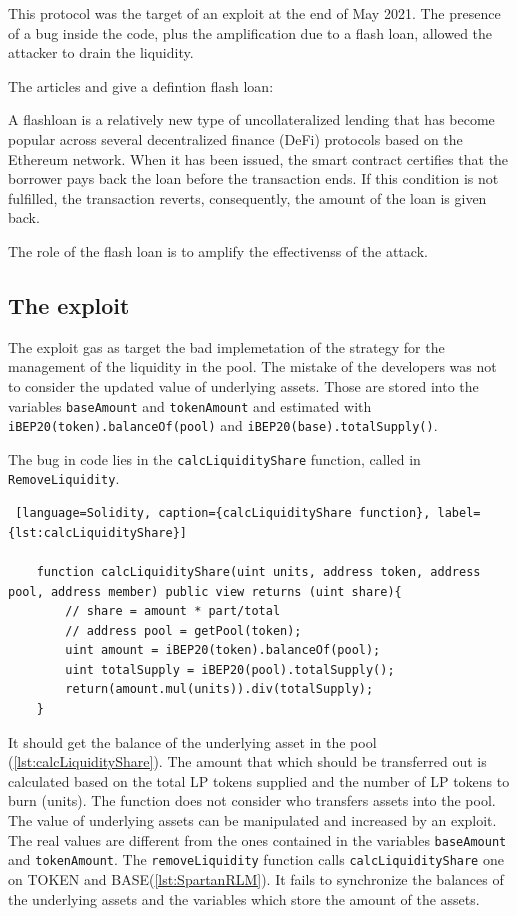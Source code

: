 This protocol was the target of an exploit at the end of May 2021.
The presence of a bug inside the code, plus the amplification due to a flash loan, allowed the attacker to drain the liquidity.

The articles \citet{FlashCoin} and \citet{FlashCloud} give a defintion flash loan:
\begin{definition}
A flashloan is a relatively new type of uncollateralized lending that has become popular across
several decentralized finance (DeFi) protocols based on the Ethereum network. 
When it has been issued, the smart contract certifies that the borrower pays back the loan before the transaction ends. 
If this condition is not fulfilled, the transaction reverts, consequently, the amount of the loan is given back. 
  \end{definition}


The role of the flash loan is to amplify the effectivenss of the attack.

\subsection{The exploit}
\label{sec:Spartan:Exploit}
The exploit gas as target the bad implemetation of the strategy for the management of the liquidity in the pool.
The mistake of the developers was not to consider the updated value of underlying assets. 
Those are stored into the variables \texttt{baseAmount} and \texttt{tokenAmount} and estimated with \texttt{iBEP20(token).balanceOf(pool)} and \texttt{iBEP20(base).totalSupply()}.

The bug in code lies in the \texttt{calcLiquidityShare} function, called in \texttt{RemoveLiquidity}. 
\begin{lstlisting} [language=Solidity, caption={calcLiquidityShare function}, label={lst:calcLiquidityShare}]

    function calcLiquidityShare(uint units, address token, address pool, address member) public view returns (uint share){
        // share = amount * part/total
        // address pool = getPool(token);
        uint amount = iBEP20(token).balanceOf(pool);
        uint totalSupply = iBEP20(pool).totalSupply();
        return(amount.mul(units)).div(totalSupply);
    }

\end{lstlisting}

It should get the balance of the underlying asset in the pool (\autoref{lst:calcLiquidityShare}). 
The amount that which should be transferred out is calculated based on the total LP tokens supplied
and the number of LP tokens to burn (units).
The function does not consider who transfers assets into the pool. The value of underlying assets can be manipulated and increased by an exploit. 
The real values are different from the ones contained in the variables \texttt{baseAmount} and \texttt{tokenAmount}.
The \texttt{removeLiquidity} function calls \texttt{calcLiquidityShare} one on TOKEN and BASE(\autoref{lst:SpartanRLM}). 
It fails to synchronize the balances of the underlying assets and the variables which store the amount of the assets.

